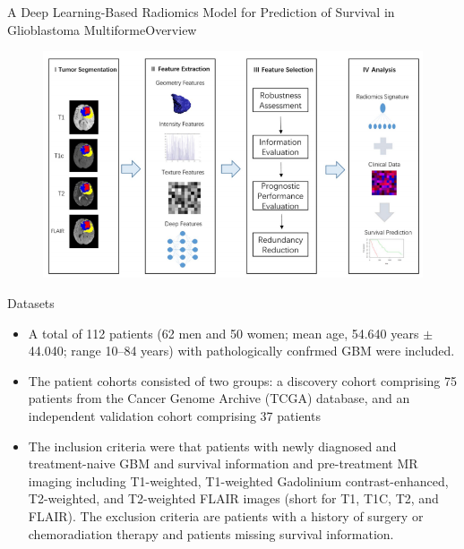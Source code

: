 \documentclass[
]{beamer}
\begin{document}
\begin{frame}{A Deep Learning-Based Radiomics
	Model for Prediction of Survival in
	Glioblastoma Multiforme}{Overview}
\begin{figure}
	\includegraphics[scale=0.5]{over2}
\end{figure}
\end{frame}

\begin{frame}{Datasets}
\begin{itemize}
	\item  A total of 112 patients (62 men and 50 women; mean age, 54.640 years $\pm$44.040;
	range 10–84 years) with pathologically confrmed GBM were included.
	\item  The patient cohorts consisted of two
	groups: a discovery cohort comprising 75 patients from the Cancer Genome Archive (TCGA) database, and
	an independent validation cohort comprising 37 patients
	\item The inclusion criteria were that patients with newly diagnosed and treatment-naive GBM and
	survival information and pre-treatment MR imaging including T1-weighted, T1-weighted Gadolinium contrast-enhanced,
	T2-weighted, and T2-weighted FLAIR images (short for T1, T1C, T2, and FLAIR). The exclusion
	criteria are patients with a history of surgery or chemoradiation therapy and patients missing survival information.
\end{itemize}
\end{frame}
\end{document}
